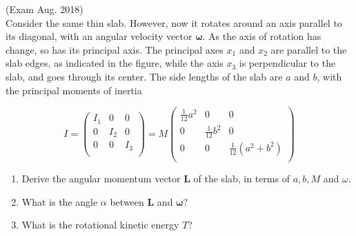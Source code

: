 \documentclass{article}
\begin{document}
        (Exam Aug. 2018)\\
        Consider the same thin slab. However, now it rotates around an axis parallel to its diagonal, with an angular velocity vector $\boldsymbol\omega$. As the axis of rotation has change, so has its principal axis. The principal axes $x_1$ and $x_2$ are parallel to the slab edges, as indicated in the figure, while the axis $x_3$ is perpendicular to the slab, and goes through its center. The side lengths of the slab are $a$ and $b$, with the principal moments of inertia

        \begin{equation*}
            I = 
            \begin{pmatrix}
                I_{1} & 0 & 0 \\
                0 & I_{2} & 0 \\
                0 & 0 & I_{3} \\
            \end{pmatrix}
            = M
            \begin{pmatrix}
                \frac{1}{12} a^2& 0 & 0 \\
                0 & \frac{1}{12} b^2 & 0 \\
                0 & 0 & \frac{1}{12} (a^2 + b^2)\\
            \end{pmatrix}
        \end{equation*}
        \begin{enumerate}[label=(\alph*)]
            \item Derive the angular momentum vector $\mathbf{L}$ of the slab, in terms of $a, b, M$ and $\omega$.
            \item What is the angle $\alpha$ between $\mathbf L$ and $\boldsymbol \omega$?
            \item What is the rotational kinetic energy $T$?
        \end{enumerate}
\end{document}
